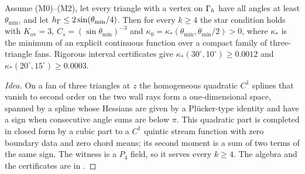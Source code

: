 \begin{theorem}\label{thm:m3}
Assume (M0)--(M2), let every triangle with a vertex on $\Gamma_h$ have all angles at least $\theta_{\min}$, and let $h_\Gamma\le2\sin(\theta_{\min}/4)$. Then for every $k\ge4$ the star condition holds with $K_{\mathrm{ov}}=3$, $C_s=(\sin\theta_{\min})^{-3}$ and $\kappa_0=\kappa_\ast(\theta_{\min},\theta_{\min}/2)>0$, where $\kappa_\ast$ is the minimum of an explicit continuous function over a compact family of three-triangle fans. Rigorous interval certificates give $\kappa_\ast(30^\circ,10^\circ)\ge0.0012$ and $\kappa_\ast(20^\circ,15^\circ)\ge0.0003$.
\end{theorem}

\begin{proof}[Idea]
On a fan of three triangles at $z$ the homogeneous quadratic $C^1$ splines that vanish to second order on the two wall rays form a one-dimensional space, spanned by a spline whose Hessians are given by a Pl\"ucker-type identity and have a sign when consecutive angle sums are below $\pi$. This quadratic part is completed in closed form by a cubic part to a $C^1$ quintic stream function with zero boundary data and zero chord means; its second moment is a sum of two terms of the same sign. The witness is a $P_4$ field, so it serves every $k\ge4$. The algebra and the certificates are in \cite{PadhiExt}.
\end{proof}

